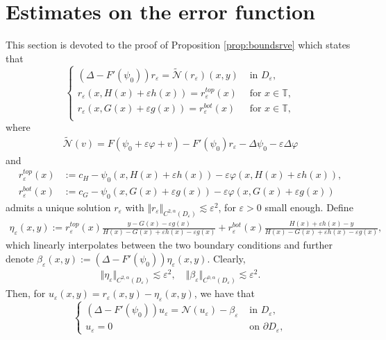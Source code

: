\documentclass[11pt,reqno]{amsproc}
\newcommand{\N}{\mathcal{N}}
\newcommand{\ve}{\varepsilon}
\numberwithin{equation}{section}
\numberwithin{theorem}{section}
\numberwithin{prop}{section}
\numberwithin{cor}{section}
\numberwithin{lemma}{section}
\theoremstyle{remark}
\theoremstyle{definition}
\begin{document}
\section{Estimates on the error function}\label{estappend}
This section is devoted to the proof of Proposition \ref{prop:boundsrve} which states that
\begin{equation}\label{eq:rveappendix}
\begin{cases}
\left(\Delta-F'(\psi_0)\right)r_\ve = \widetilde{\N}(r_\ve)(x,y) & \text{ in } D_\ve, \\
r_\ve(x,H(x)+\ve h(x))= r_\ve^{top}(x) & \text{ for } x\in \mathbb{T}, \\
r_\ve(x, G(x)+\ve g(x))= r_\ve^{bot}(x) & \text{ for } x\in\mathbb{T}, \\
\end{cases}
\end{equation}
where
\begin{align*}
\widetilde{\N}(v) = F(\psi_0 + \ve\varphi + v) - F'(\psi_0)r_\ve -\Delta\psi_0 - \ve\Delta \varphi
\end{align*}
and
\begin{align*}
r_\ve^{top}(x)&:= c_H-  \psi_0(x,H(x)+\ve h(x)) - \ve  \varphi(x,H(x)+\ve h(x)), \\
r_\ve^{bot}(x)&:= c_G-  \psi_0(x,G(x)+\ve g(x))- \ve\varphi(x,G(x)+\ve g(x)) 
\end{align*}
admits a unique solution $r_\ve$ with $\Vert r_\ve \Vert_{C^{2,\alpha}(D_\ve)}\lesssim \ve^2$, for $\ve>0$ small enough. Define
\begin{align*}\label{eq:defeta}
\eta_\ve(x,y) := r_\ve^{top}(x)\frac{y-G(x)-\ve g(x)}{H(x)-G(x) + \ve h(x) - \ve g(x)} + r_\ve^{bot}(x)\frac{H(x)+ \ve h(x) - y}{H(x)-G(x) + \ve h(x) - \ve g(x)}, 
\end{align*}
which linearly interpolates between the two boundary conditions and further denote $\beta_\ve(x,y) := (\Delta - F'(\psi_0))\eta_\ve(x,y)$. Clearly,
\begin{align*}
\Vert \eta_\ve \Vert_{C^{2,\alpha}(D_\ve)}\lesssim \ve^2, \quad \Vert \beta_\ve\Vert_{C^{0,\alpha}(D_\ve)}\lesssim \ve^2.
\end{align*}
Then, for $u_\ve(x,y) = r_\ve(x,y) - \eta_\ve(x,y)$, we have that
\begin{equation}\label{eq:uve}
\begin{cases}
\left(\Delta-F'(\psi_0)\right)u_\ve = \N(u_\ve) - \beta_\ve   & \text{ in } D_\ve, \\
u_\ve = 0 & \text{ on } \partial D_\ve, 
\end{cases}
\end{equation}
\end{document}
